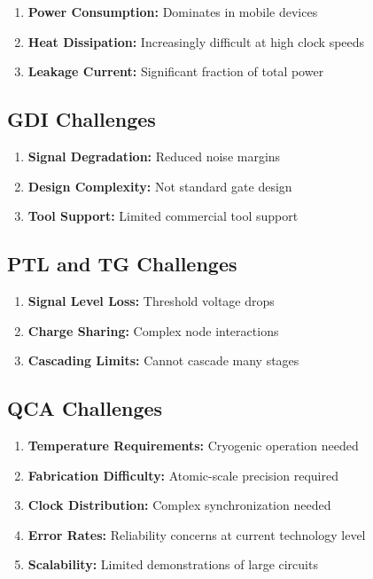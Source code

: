 \documentclass[12pt,a4paper,twoside]{report}
\begin{document}
\begin{enumerate}
    \item \textbf{Power Consumption:} Dominates in mobile devices
    \item \textbf{Heat Dissipation:} Increasingly difficult at high clock speeds
    \item \textbf{Leakage Current:} Significant fraction of total power
\end{enumerate}

\subsection{GDI Challenges}

\begin{enumerate}
    \item \textbf{Signal Degradation:} Reduced noise margins
    \item \textbf{Design Complexity:} Not standard gate design
    \item \textbf{Tool Support:} Limited commercial tool support
\end{enumerate}

\subsection{PTL and TG Challenges}

\begin{enumerate}
    \item \textbf{Signal Level Loss:} Threshold voltage drops
    \item \textbf{Charge Sharing:} Complex node interactions
    \item \textbf{Cascading Limits:} Cannot cascade many stages
\end{enumerate}

\subsection{QCA Challenges}

\begin{enumerate}
    \item \textbf{Temperature Requirements:} Cryogenic operation needed
    \item \textbf{Fabrication Difficulty:} Atomic-scale precision required
    \item \textbf{Clock Distribution:} Complex synchronization needed
    \item \textbf{Error Rates:} Reliability concerns at current technology level
    \item \textbf{Scalability:} Limited demonstrations of large circuits
\end{enumerate}
\end{document}
